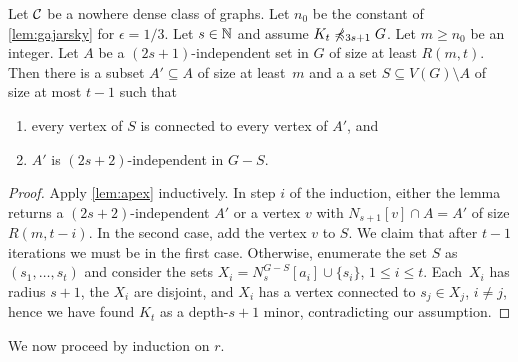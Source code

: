 \begin{lemma}\label{lem:iterate-apex}
Let $\mathcal{C}$ be a nowhere dense class of graphs. 
Let $n_0$ be the constant of \cref{lem:gajarsky} for $\epsilon=1/3$. 
Let $s\in \mathbb{N}$ and assume $K_t\not\preccurlyeq_{3s+1} G$. 
Let $m\geq n_0$ be an integer. 
Let $A$ be a $(2s+1)$-independent set in $G$ of size at least $R(m,t)$. 
Then there is a subset $A'\subseteq A$ of size at least~$m$ and a 
a set $S\subseteq V(G)\setminus A$ of size at most $t-1$ such that
\begin{enumerate}
\item every vertex of $S$ is connected to every vertex of $A'$, and
\item $A'$ is $(2s+2)$-independent in $G-S$. 
\end{enumerate} 
\end{lemma}
\begin{proof}
Apply \cref{lem:apex} inductively. In step $i$ of the induction,
either the lemma returns a $(2s+2)$-independent $A'$ or a vertex $v$
with $N_{s+1}[v]\cap A=A'$ of size $R(m,t-i)$. In the second
case, add the vertex $v$ to $S$. We claim that after $t-1$
iterations we must be in the first case. Otherwise, enumerate the set $S$ 
as $(s_1,\ldots, s_t)$ and consider the sets
$X_i=N_s^{G-S}[a_i]\cup \{s_i\}$, $1\leq i\leq t$. Each~$X_i$ has radius
$s+1$, the $X_i$ are disjoint, and $X_i$ has a vertex connected to $s_j\in X_j$, $i\neq j$, 
hence we have found $K_t$ as a depth-$s+1$ minor, contradicting
our assumption. 
\end{proof}

We now proceed by induction on $r$. 

